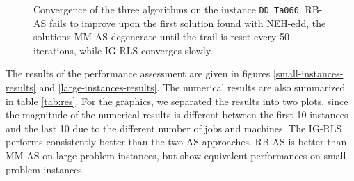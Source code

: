 \documentclass[runningheads]{llncs}
\begin{document}
\begin{figure}
\begin{minipage}{.48\textwidth}
		\caption{Convergence of the three algorithms on the instance
		\texttt{DD\_Ta060}. RB-AS fails to improve upon the first solution found
		with NEH-edd, the solutions MM-AS degenerate until the trail is reset
		every 50 iterations, while IG-RLS converges slowly.}
		\label{convergence}
    \end{minipage}
\end{figure}

The results of the performance assessment are given in figures
\ref{small-instances-results} and \ref{large-instances-results}. The numerical
results are also summarized in table \ref{tab:res}. For the graphics, we
separated the results into two plots, since the magnitude of the numerical
results is different between the first 10 instances and the last 10 due to the
different number of jobs and machines. The IG-RLS performs consistently better
than the two AS approaches. RB-AS is better than MM-AS on large problem
instances, but show equivalent performances on small problem instances.
\end{document}
